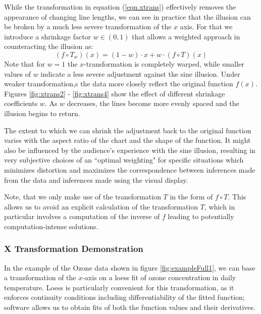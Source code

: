 \documentclass[11pt]{isuthesis}\usepackage[]{graphicx}\usepackage[]{color}
\begin{document}
While the transformation in equation (\ref{eqn.xtrans}) effectively removes the appearance of changing line lengths, we can see in practice that the illusion can be broken by a much less severe transformation of the $x$ axis. 
For that we introduce a shrinkage factor $w \in (0,1)$ that allows a weighted approach in counteracting the illusion as: 
%
\begin{equation}\label{eqn.xtrans.weighted}
(f \circ T_w)(x) = (1-w) \cdot x + w \cdot (f \circ T)(x)
\end{equation}
%
Note that for $w=1$ the $x$-transformation is completely warped, while smaller values of $w$ indicate a less severe adjustment against the sine illusion.  Under  weaker transformation,s the data more closely reflect the original function $f(x)$. 
Figures \ref{fig:xtrans2} - \ref{fig:xtrans4} show the effect of different shrinkage coefficients $w$. As $w$ decreases, the lines become more evenly spaced and the illusion begins to return. 

The extent  to which we can shrink the adjustment back to the original function  varies with the aspect ratio of the chart and the shape of the function. It might also be influenced by the audience's experience with the sine illusion, resulting in very subjective choices of an ``optimal weighting" for specific situations which minimizes distortion and maximizes the correspondence between inferences made from the data and inferences made using the visual display.


Note, that we only make use of the transformation $T$ in the form of $f \circ T$. This allows us to avoid an explicit calculation of the transformation $T$, which in particular  involves a computation of the inverse of $f$ leading to potentially computation-intense solutions. 
\subsubsection{X Transformation Demonstration}



In the example of the Ozone data shown in figure \ref{fig:exampleFull1}, we can base a transformation of the $x$-axis on a loess fit of ozone concentration in daily temperature. Loess is particularly convenient for this transformation, as it enforces continuity conditions including differentiability of the fitted function; software allows us to obtain fits of both the function values and their derivatives.
\end{document}
